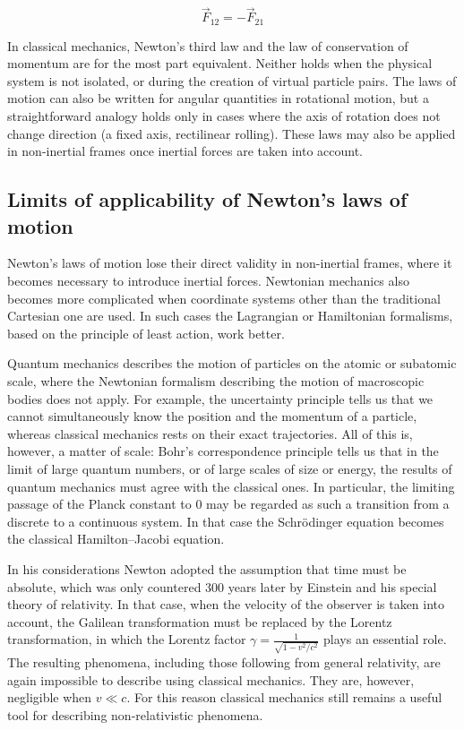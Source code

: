 \[
\vec{F}_{12} = -\vec{F}_{21}
\]

In classical mechanics, Newton's third law and the law of conservation of momentum are for the most part equivalent. Neither holds when the physical system is not isolated, or during the creation of virtual particle pairs. The laws of motion can also be written for angular quantities in rotational motion, but a straightforward analogy holds only in cases where the axis of rotation does not change direction (a fixed axis, rectilinear rolling). These laws may also be applied in non-inertial frames once inertial forces are taken into account.

\subsection{Limits of applicability of Newton's laws of motion}

Newton's laws of motion lose their direct validity in non-inertial frames, where it becomes necessary to introduce inertial forces. Newtonian mechanics also becomes more complicated when coordinate systems other than the traditional Cartesian one are used. %
In such cases the Lagrangian or Hamiltonian formalisms, based on the principle of least action, work better.

Quantum mechanics describes the motion of particles on the atomic or subatomic scale, where the Newtonian formalism describing the motion of macroscopic bodies does not apply. For example, the uncertainty principle tells us that we cannot simultaneously know the position and the momentum of a particle, whereas classical mechanics rests on their exact trajectories. All of this is, however, a matter of scale: Bohr's correspondence principle tells us that in the limit of large quantum numbers, or of large scales of size or energy, the results of quantum mechanics must agree with the classical ones. In particular, the limiting passage of the Planck constant to $0$ may be regarded as such a transition from a discrete to a continuous system. In that case the Schrödinger equation becomes the classical Hamilton--Jacobi equation.

In his considerations Newton adopted the assumption that time must be absolute, which was only countered 300 years later by Einstein and his special theory of relativity. In that case, when the velocity of the observer is taken into account, the Galilean transformation must be replaced by the Lorentz transformation, in which the Lorentz factor $\gamma=\frac{1}{\sqrt{1 - v^2/c^2}}$ plays an essential role. The resulting phenomena, including those following from general relativity, are again impossible to describe using classical mechanics. They are, however, negligible when $v \ll c$. For this reason classical mechanics still remains a useful tool for describing non-relativistic phenomena.


